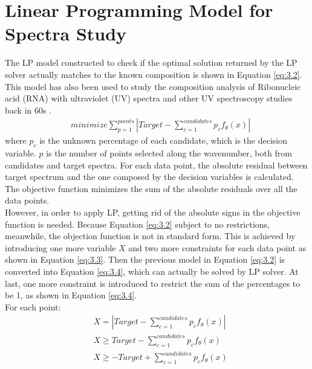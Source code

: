 \section{Linear Programming Model for Spectra Study}

The LP model constructed to check if the optimal solution returned by the LP solver actually matches to the known composition is shown in Equation \ref{eq:3.2}. This model has also been used to study the composition analysis of Ribonucleic acid (RNA) with ultraviolet (UV) spectra and other UV spectroscopy studies back in 60s \cite{NYAS:NYAS900} \cite{LPATUAS}. \\

\begin{eqnarray} \label{eq:3.2}
& minimize \displaystyle\sum^{points}_{p=1} \left| Target- \displaystyle\sum^{candidates}_{c=1}p_{c}f_{\theta}(x) \right| 
\end{eqnarray}
where $p_{c}$ is the unknown percentage of each candidate, which is the decision variable. $p$ is the number of points selected along the wavenumber, both from candidates and target spectra. For each data point, the absolute residual between target spectrum and the one composed by the decision variables is calculated. The objective function minimizes the sum of the absolute residuals over all the data points. \\

However, in order to apply LP, getting rid of the absolute signs in the objective function is needed. Because Equation \ref{eq:3.2} subject to no restrictions, meanwhile, the objection function is not in standard form. This is achieved by introducing one more variable $X$ and two more constraints for each data point as shown in Equation \ref{eq:3.3}. Then the previous model in Equation \ref{eq:3.2} is converted into Equation \ref{eq:3.4}, which can actually be solved by LP solver. At last, one more constraint is introduced to restrict the sum of the percentages to be 1, as shown in Equation \ref{eq:3.4}. \\

For each point:
\begin{eqnarray} \label{eq:3.3}
& X = \left| Target-\displaystyle\sum^{candidates}_{c=1}p_{c}f_{\theta}(x) \right| \nonumber \\
&  X \geq Target-\displaystyle\sum^{candidates}_{c=1}p_{c}f_{\theta}(x)   \nonumber \\
& X \geq -Target+\displaystyle\sum^{candidates}_{c=1}p_{c}f_{\theta}(x)  
\end{eqnarray} 

